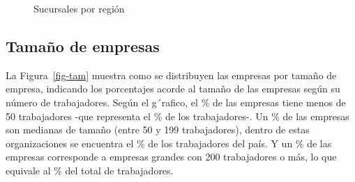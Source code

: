 \documentclass[
  11pt,
]{article}
\begin{document}
\FloatBarrier

\begin{figure}[H]

\caption{\label{fig-burbujas}Sucursales por región}


\end{figure}%

\FloatBarrier

\subsection{Tamaño de empresas}\label{tamauxf1o-de-empresas}

La Figura~\ref{fig-tam} muestra como se distribuyen las empresas por
tamaño de empresa, indicando los porcentajes acorde al tamaño de las
empresas según su número de trabajadores. Según el g´rafico, el
\% de las empresas tiene menos de 50 trabajadores -que
representa el \% de los trabajadores-. Un \% de
las empresas son medianas de tamaño (entre 50 y 199 trabajadores),
dentro de estas organizaciones se encuentra el \% de los
trabajadores del país. Y un \% de las empresas corresponde a
empresas grandes con 200 trabajadores o más, lo que equivale al
\% del total de trabajadores.
\end{document}
